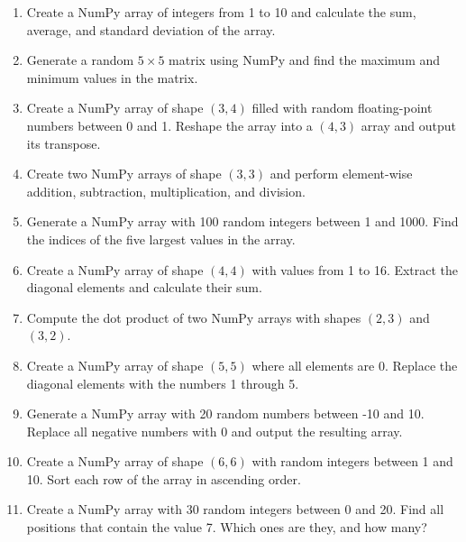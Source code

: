 \documentclass{config/minimal_uebungszettel}
\theoremstyle{definition}
\begin{document}
    \begin{enumerate}

            \item Create a NumPy array of integers from 1 to 10 and calculate the sum, average, and standard deviation of the array.
            
            \item Generate a random $5 \times 5$ matrix using NumPy and find the maximum and minimum values in the matrix.
            
            \item Create a NumPy array of shape $(3, 4)$ filled with random floating-point numbers between 0 and 1. Reshape the array into a $(4, 3)$ array and output its transpose.
            
            \item Create two NumPy arrays of shape $(3, 3)$ and perform element-wise addition, subtraction, multiplication, and division.
            
            \item Generate a NumPy array with 100 random integers between 1 and 1000. Find the indices of the five largest values in the array.
            
            \item Create a NumPy array of shape $(4, 4)$ with values from 1 to 16. Extract the diagonal elements and calculate their sum.
            
            \item Compute the dot product of two NumPy arrays with shapes $(2, 3)$ and $(3, 2)$.
            
            \item Create a NumPy array of shape $(5, 5)$ where all elements are 0. Replace the diagonal elements with the numbers 1 through 5.
            
            \item Generate a NumPy array with 20 random numbers between -10 and 10. Replace all negative numbers with 0 and output the resulting array.
            
            \item Create a NumPy array of shape $(6, 6)$ with random integers between 1 and 10. Sort each row of the array in ascending order.
            
            \item Create a NumPy array with 30 random integers between 0 and 20. Find all positions that contain the value 7. Which ones are they, and how many?
    \end{enumerate}
\end{document}
